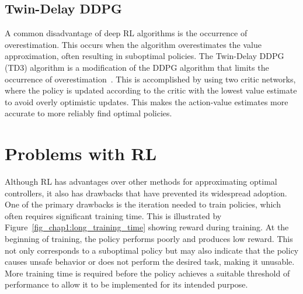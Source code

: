 
\subsection{Twin-Delay DDPG}
A common disadvantage of deep RL algorithms is the occurrence of overestimation. This occurs when the algorithm overestimates the value approximation, often resulting in suboptimal policies. 
The Twin-Delay DDPG (TD3) algorithm is a modification of the DDPG algorithm that limits the occurrence of overestimation~\cite{Fujimoto:2018a}. This is accomplished by using two critic networks, where the policy is updated according to the critic with the lowest value estimate to avoid overly optimistic updates.
%
This makes the action-value estimates more accurate to more reliably find optimal policies.

\section{Problems with RL}
\label{sec:RL_drawbacks}
%
Although RL has advantages over other methods for approximating optimal controllers, it also has drawbacks that have prevented its widespread adoption.
%
One of the primary drawbacks is the iteration needed to train policies, which often requires significant training time. This is illustrated by Figure~\ref{fig_chap1:long_training_time} showing reward during training. At the beginning of training, the policy performs poorly and produces low reward. This not only corresponds to a suboptimal policy but may also indicate that the policy causes unsafe behavior or does not perform the desired task, making it unusable. More training time is required before the policy achieves a suitable threshold of performance to allow it to be implemented for its intended purpose.

